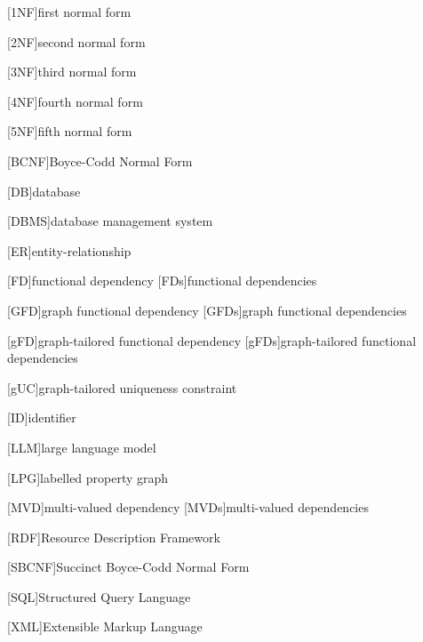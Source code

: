 \begin{acronym}

[1NF]{first normal form}

[2NF]{second normal form}

[3NF]{third normal form}

[4NF]{fourth normal form}

[5NF]{fifth normal form}

[BCNF]{Boyce-Codd Normal Form}

[DB]{database}

[DBMS]{database management system}

[ER]{entity-relationship}

[FD]{functional dependency}
[FDs]{functional dependencies}

[GFD]{graph functional dependency}
[GFDs]{graph functional dependencies}

[gFD]{graph-tailored functional dependency}
[gFDs]{graph-tailored functional dependencies}

[gUC]{graph-tailored uniqueness constraint}

[ID]{identifier}

[LLM]{large language model}

[LPG]{labelled property graph}

[MVD]{multi-valued dependency}
[MVDs]{multi-valued dependencies}

[RDF]{Resource Description Framework}

[SBCNF]{Succinct Boyce-Codd Normal Form} %

[SQL]{Structured Query Language}

[XML]{Extensible Markup Language}

\end{acronym}
